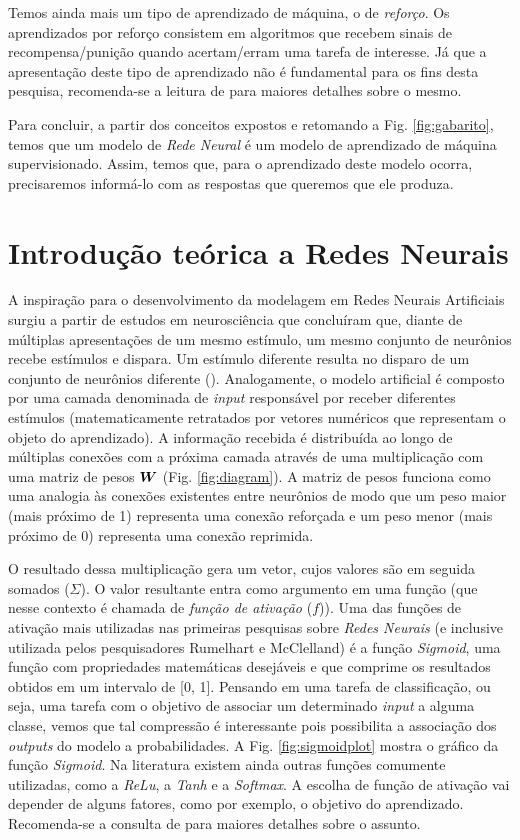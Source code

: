 Temos ainda mais um tipo de aprendizado de máquina, o de \textit{reforço}. Os aprendizados por reforço consistem em algoritmos que recebem sinais de recompensa/punição quando acertam/erram uma tarefa de interesse. Já que a apresentação deste tipo de aprendizado não é fundamental para os fins desta pesquisa, recomenda-se a leitura de \cite{KLMSurvey:1996} para maiores detalhes sobre o mesmo.

Para concluir, a partir dos conceitos expostos e retomando a Fig. \ref{fig:gabarito}, temos que um modelo de \textit{Rede Neural} é um modelo de aprendizado de máquina supervisionado. Assim, temos que, para o aprendizado deste modelo ocorra, precisaremos informá-lo com as respostas que queremos que ele produza.

\section{Introdução teórica a Redes Neurais}
\label{sec:intro-rn}
A inspiração para o desenvolvimento da modelagem em Redes Neurais Artificiais surgiu a partir de estudos em neurosciência que concluíram que, diante de múltiplas apresentações de um mesmo estímulo, um mesmo conjunto de neurônios recebe estímulos e dispara. Um estímulo diferente resulta no disparo de um conjunto de neurônios diferente (\cite{hubel:1962}). Analogamente, o modelo artificial é composto por uma camada denominada de \textit{input} responsável por receber diferentes estímulos (matematicamente retratados por vetores numéricos que representam o objeto do aprendizado). A informação recebida é distribuída ao longo de múltiplas conexões com a próxima camada através de uma multiplicação com uma matriz de pesos $\bm{W}$ (Fig. \ref{fig:diagram}). A matriz de pesos funciona como uma analogia às conexões existentes entre neurônios de modo que um peso maior (mais próximo de 1) representa uma conexão reforçada e um peso menor (mais próximo de 0) representa uma conexão reprimida.

  

O resultado dessa multiplicação gera um vetor, cujos valores são em seguida somados ($\displaystyle\Sigma$). O valor resultante entra como argumento em uma função (que nesse contexto é chamada de \textit{função de ativação} ($f$)). Uma das funções de ativação mais utilizadas nas primeiras pesquisas sobre \textit{Redes Neurais} (e inclusive utilizada pelos pesquisadores Rumelhart e McClelland) é a função \textit{Sigmoid}, uma função com propriedades matemáticas desejáveis e que comprime os resultados obtidos em um intervalo de [0, 1]. Pensando em uma tarefa de classificação, ou seja, uma tarefa com o objetivo de associar um determinado \textit{input} a alguma classe, vemos que tal compressão é interessante pois possibilita a associação dos \textit{outputs} do modelo a probabilidades. A Fig. \ref{fig:sigmoidplot} mostra o gráfico da função \textit{Sigmoid}. Na literatura existem ainda outras funções comumente utilizadas, como a \textit{ReLu}, a \textit{Tanh} e a \textit{Softmax}. A escolha de função de ativação vai depender de alguns fatores, como por exemplo, o objetivo do aprendizado. Recomenda-se a consulta de \cite{Goodfellow-et-al-2016} para maiores detalhes sobre o assunto.

